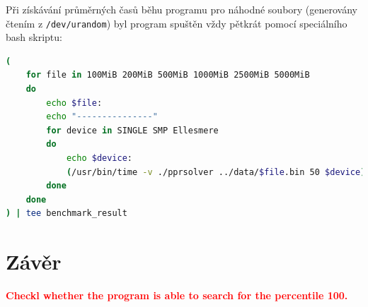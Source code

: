 \documentclass[12pt, a4paper]{article}
\let\oldsection\section
\renewcommand\section{\clearpage\oldsection}
\begin{document}
\newpage
Při získávání průměrných časů běhu programu pro náhodné soubory (generovány čtením z \texttt{/dev/urandom}) byl program spuštěn vždy pětkrát pomocí speciálního bash skriptu:

\begin{lstlisting}[language=bash,caption={Bash skript pro spuštění vytvořeného programu pro různé soubory a pro všechna dostupná zařízení.},captionpos=b, label={lst:benchmark-script}]
(
    for file in 100MiB 200MiB 500MiB 1000MiB 2500MiB 5000MiB
    do
        echo $file:
        echo "---------------"
        for device in SINGLE SMP Ellesmere
        do 
            echo $device:
            (/usr/bin/time -v ./pprsolver ../data/$file.bin 50 $device) 2>&1 | grep -E "Maximum resident set size|Elapsed|e) page faults"
        done 
    done
) | tee benchmark_result
\end{lstlisting}

\section{Závěr}

\textcolor{red}{\textbf{Checkl whether the program is able to search for the percentile 100.}} 
\end{document}

